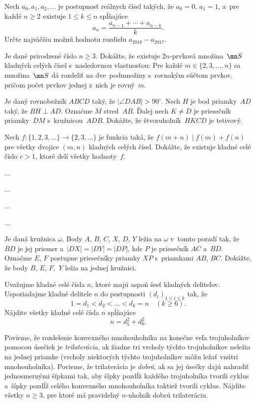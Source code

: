 {%
 Nech $a_0,a_1,a_2,\ldots$ je postupnosť reálnych čísel takých, že $a_0=0$, $a_1=1$, a~pre každé $n \ge 2$ existuje $1 \leq k \leq n$ spĺňajúce
$$
a_n = \frac{a_{n-1}+\cdots+a_{n-k}}{k}.
$$
Určte najväčšiu možnú hodnotu rozdielu $a_{2018}-a_{2017}$.
}

{%
 Je dané prirodzené číslo $n \ge 3$. Dokážte, že existuje $2n$-prvková množina~$\mn S$ kladných celých čísel s~nasledovnou vlastnosťou: Pre každé $m \in \{2,3,\ldots,n\}$ sa množina~$\mn S$ dá rozdeliť na dve~podmnožiny s~rovnakým súčtom prvkov, pričom počet prvkov jednej z~nich je rovný~$m$.
}

{%
 Je daný rovnobežník $ABCD$ taký, že $|\angle DAB|>90^\circ$. Nech $H$ je bod priamky~$AD$ taký, že $BH \perp AD$. Označme $M$ stred~$AB$. Ďalej nech $K \ne D$ je priesečník priamky~$DM$ s~kružnicou~$ADB$. Dokážte, že štvoruholník~$HKCD$ je tetivový.
}

{%
 Nech $f:\{1,2,3,\ldots\} \to \{2,3,\ldots\}$ je funkcia taká, že $f(m+n)\mid f(m)+f(n)$ pre všetky dvojice $(m,n)$ kladných celých čísel. Dokážte, že existuje kladné celé číslo $c>1$, ktoré delí všetky hodnoty~$f$.
}

{%
...}

{%
...}

{%
...}

{%
...}

{%
Je daná kružnica $\omega$. Body $A$, $B$, $C$, $X$, $D$, $Y$ ležia na $\omega$ v~tomto poradí tak, že $BD$ je jej priemer a~$|DX|=|DY|=|DP|$, kde $P$ je priesečník $AC$ a~$BD$.
Označme $E$, $F$ postupne priesečníky priamky $XP$ s~priamkami $AB$, $BC$. Dokážte, že body $B$, $E$, $F$,~$Y$ ležia na jednej kružnici.}

{%
Uvažujme kladné celé čísla $n$, ktoré majú aspoň šesť kladných deliteľov. Usporiadajme kladné delitele $n$ do postupnosti $(d_i)_{1\le i\le k}$ tak, že
$$
1=d_1 <d_2 <\dots <d_k =n \quad (k\ge 6).
$$
Nájdite všetky kladné celé čísla $n$ spĺňajúce
$$
n = d_5^2+d_6^2.
$$}

{%
Povieme, že rozdelenie konvexného mnohouholníka na konečne veľa trojuholníkov pomocou úsečiek je {\it trilaterácia}, ak žiadne tri vrcholy týchto trojuholníkov neležia na jednej priamke (vrcholy niektorých týchto trojuholníkov môžu ležať vnútri mnohouholníka). Povieme, že trilaterácia je {\it dobrá}, ak sa jej úsečky dajú nahradiť jednosmernými šípkami tak, aby šípky pozdĺž každého trojuholníka tvorili cyklus a~šípky pozdĺž celého konvexného mnohouholníka taktiež tvorili cyklus. Nájdite všetky $n \ge 3$, pre ktoré má pravidelný $n$-uholník dobrú trilateráciu.}

